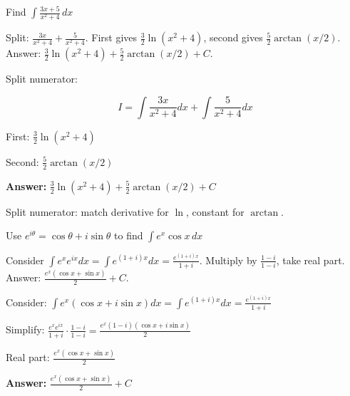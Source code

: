 \vspace{1cm}

\begin{problem}
Find $\displaystyle \int \frac{3x + 5}{x^2 + 4} \, dx$
\end{problem}

\begin{hint}
Split: $\frac{3x}{x^2+4} + \frac{5}{x^2+4}$. First gives $\frac{3}{2}\ln(x^2+4)$, second gives $\frac{5}{2}\arctan(x/2)$. Answer: $\frac{3}{2}\ln(x^2+4) + \frac{5}{2}\arctan(x/2) + C$.
\end{hint}

\begin{solution}
Split numerator:

\[
I = \int\frac{3x}{x^2+4}dx + \int\frac{5}{x^2+4}dx
\]

First: $\frac{3}{2}\ln(x^2+4)$

Second: $\frac{5}{2}\arctan(x/2)$

\textbf{Answer:} $\boxed{\frac{3}{2}\ln(x^2+4) + \frac{5}{2}\arctan(x/2) + C}$
\end{solution}

\begin{takeaways}
Split numerator: match derivative for $\ln$, constant for $\arctan$.
\end{takeaways}

\vspace{1cm}

\begin{problem}
Use $e^{i\theta} = \cos\theta + i\sin\theta$ to find $\displaystyle \int e^x \cos x \, dx$
\end{problem}

\begin{hint}
Consider $\int e^x e^{ix}dx = \int e^{(1+i)x}dx = \frac{e^{(1+i)x}}{1+i}$. Multiply by $\frac{1-i}{1-i}$, take real part. Answer: $\frac{e^x(\cos x + \sin x)}{2} + C$.
\end{hint}

\begin{solution}
Consider: $\int e^x(\cos x + i\sin x)dx = \int e^{(1+i)x}dx = \frac{e^{(1+i)x}}{1+i}$

Simplify: $\frac{e^x e^{ix}}{1+i} \cdot \frac{1-i}{1-i} = \frac{e^x(1-i)(\cos x+i\sin x)}{2}$

Real part: $\frac{e^x(\cos x + \sin x)}{2}$

\textbf{Answer:} $\boxed{\frac{e^x(\cos x + \sin x)}{2} + C}$
\end{solution}

